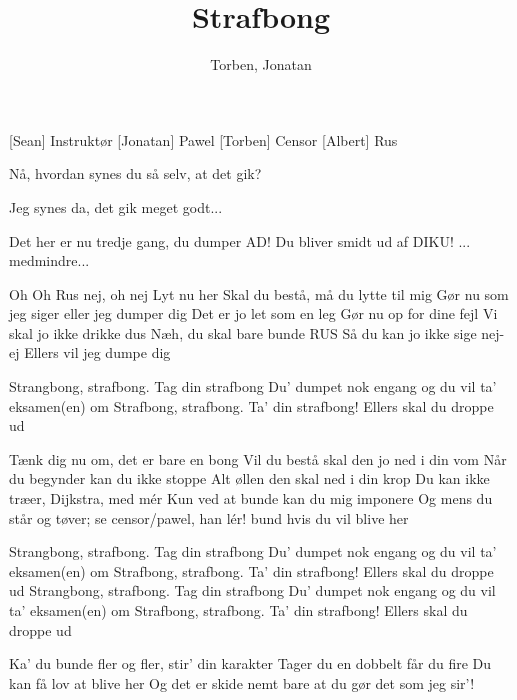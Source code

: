 \documentclass[a4paper,11pt]{article}
\title{Strafbong}
\author{Torben, Jonatan}
\begin{document}
\maketitle

\begin{roles}
[Sean] Instruktør
[Jonatan] Pawel
[Torben] Censor
[Albert] Rus
\end{roles}

\begin{props}
\end{props}


\begin{song}

 Nå, hvordan synes du så selv, at det gik?

 Jeg synes da, det gik meget godt...

 Det her er nu tredje gang, du dumper AD! Du bliver smidt ud af DIKU!
 ... medmindre...

Oh
Oh Rus
nej, oh nej
Lyt nu her 
Skal du bestå, må du lytte til mig
Gør nu som jeg siger eller jeg dumper dig
Det er jo let som en leg
Gør nu op for dine fejl 
Vi skal jo ikke drikke dus
Næh, du skal bare bunde RUS
Så du kan jo ikke sige nej-ej
Ellers vil jeg dumpe dig

Strangbong, strafbong. Tag din strafbong
Du’ dumpet nok engang og du vil ta’ eksamen(en) om
Strafbong, strafbong. Ta’ din strafbong!
Ellers skal du droppe ud

Tænk dig nu om, det er bare en bong 
Vil du bestå skal den jo ned i din vom
Når du begynder kan du ikke stoppe 
Alt øllen den skal ned i din krop
Du kan ikke træer, Dijkstra, med mér
Kun ved at bunde kan du mig imponere
Og mens du står og tøver; se censor/pawel, han lér!
bund hvis du vil blive her

Strangbong, strafbong. Tag din strafbong
Du’ dumpet nok engang og du vil ta’ eksamen(en) om
Strafbong, strafbong. Ta’ din strafbong!
Ellers skal du droppe ud
Strangbong, strafbong. Tag din strafbong
Du’ dumpet nok engang og du vil ta’ eksamen(en) om
Strafbong, strafbong. Ta’ din strafbong!
Ellers skal du droppe ud

Ka’ du bunde fler og fler, stir’ din karakter 
Tager du en dobbelt får du fire
Du kan få lov at blive her 
Og det er skide nemt bare at du gør det som jeg sir’!



\end{song}
\end{document}

